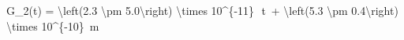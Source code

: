 G_2(t) = \SI[parse-numbers = false]{\left(2.3 \pm 5.0\right) \times 10^{-11}}{}\, \cdot \,t\, + \SI[parse-numbers = false]{\left(5.3 \pm 0.4\right) \times 10^{-10}}{\meter}